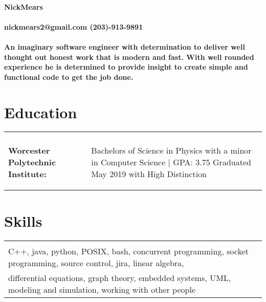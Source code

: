\documentclass[10pt]{article}
\begin{document}
\paragraph{\centering \huge NickMears \\ }
\paragraph{\centering nickmears2@gmail.com (203)-913-9891 \\}

\paragraph{An imaginary software engineer with determination to deliver well thought out honest work that is modern and fast. With well rounded experience he is determined to provide insight to create simple and functional code to get the job done.}

\section*{Education}
\begin{tabular}{l l}
  \hline
  \multicolumn{2}{c}{} \\
  \begin{minipage}[t]{7cm}
    \begin{flushleft}
      \large \textbf{Worcester Polytechnic Institute:}
    \end{flushleft}
  \end{minipage} & 
  \begin{minipage}[t]{13cm}
    \begin{flushleft}
      Bachelors of Science in Physics with a minor in Computer Science $|$ GPA: 3.75 Graduated May 2019 with High Distinction
    \end{flushleft}
  \end{minipage}
\end{tabular}

\section*{Skills}
\begin{tabular}{l}
  \hline
  \multicolumn{1}{c}{} \\
  C++, java, python, POSIX, bash, concurrent programming, socket programming, source control, jira, linear algebra,\\
  differential equations, graph theory, embedded systems, UML, modeling and simulation, working with other people
\end{tabular}
\end{document}
